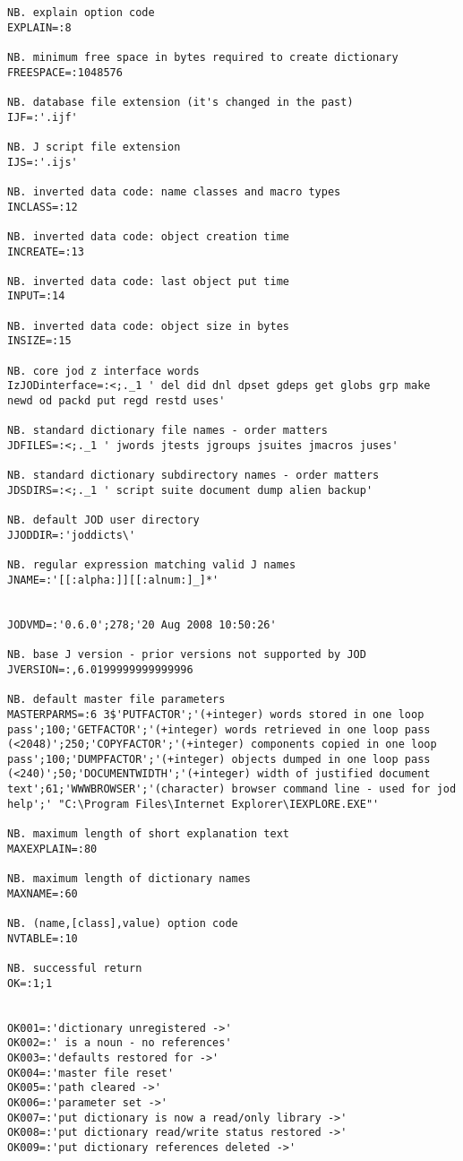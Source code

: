 \begin{lstlisting}[frame=single,framerule=0pt,basicstyle=\ttfamily\tiny]
NB. explain option code
EXPLAIN=:8

NB. minimum free space in bytes required to create dictionary
FREESPACE=:1048576

NB. database file extension (it's changed in the past)
IJF=:'.ijf'

NB. J script file extension
IJS=:'.ijs'

NB. inverted data code: name classes and macro types
INCLASS=:12

NB. inverted data code: object creation time
INCREATE=:13

NB. inverted data code: last object put time
INPUT=:14

NB. inverted data code: object size in bytes
INSIZE=:15

NB. core jod z interface words
IzJODinterface=:<;._1 ' del did dnl dpset gdeps get globs grp make newd od packd put regd restd uses'

NB. standard dictionary file names - order matters
JDFILES=:<;._1 ' jwords jtests jgroups jsuites jmacros juses'

NB. standard dictionary subdirectory names - order matters
JDSDIRS=:<;._1 ' script suite document dump alien backup'

NB. default JOD user directory
JJODDIR=:'joddicts\'

NB. regular expression matching valid J names
JNAME=:'[[:alpha:]][[:alnum:]_]*'


JODVMD=:'0.6.0';278;'20 Aug 2008 10:50:26'

NB. base J version - prior versions not supported by JOD
JVERSION=:,6.0199999999999996

NB. default master file parameters
MASTERPARMS=:6 3$'PUTFACTOR';'(+integer) words stored in one loop pass';100;'GETFACTOR';'(+integer) words retrieved in one loop pass (<2048)';250;'COPYFACTOR';'(+integer) components copied in one loop pass';100;'DUMPFACTOR';'(+integer) objects dumped in one loop pass (<240)';50;'DOCUMENTWIDTH';'(+integer) width of justified document text';61;'WWWBROWSER';'(character) browser command line - used for jod help';' "C:\Program Files\Internet Explorer\IEXPLORE.EXE"'

NB. maximum length of short explanation text
MAXEXPLAIN=:80

NB. maximum length of dictionary names
MAXNAME=:60

NB. (name,[class],value) option code
NVTABLE=:10

NB. successful return
OK=:1;1


OK001=:'dictionary unregistered ->'
OK002=:' is a noun - no references'
OK003=:'defaults restored for ->'
OK004=:'master file reset'
OK005=:'path cleared ->'
OK006=:'parameter set ->'
OK007=:'put dictionary is now a read/only library ->'
OK008=:'put dictionary read/write status restored ->'
OK009=:'put dictionary references deleted ->'


\end{lstlisting}
